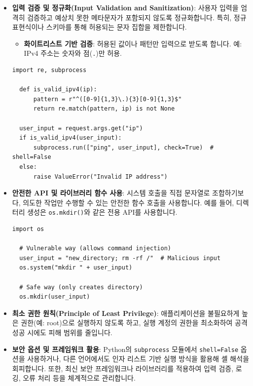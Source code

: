 \documentclass{article}
\begin{document}
\begin{itemize}
  \item \textbf{입력 검증 및 정규화(Input Validation and Sanitization)}:  
  사용자 입력을 엄격히 검증하고 예상치 못한 메타문자가 포함되지 않도록 정규화합니다.  
  특히, 정규 표현식이나 스키마를 통해 허용되는 문자 집합을 제한합니다.  
  \begin{itemize}
    \item \textbf{화이트리스트 기반 검증}: 허용된 값이나 패턴만 입력으로 받도록 합니다.  
    예: IPv4 주소는 숫자와 점(\texttt{.})만 허용.
  \end{itemize}

  \begin{lstlisting}[caption={Python 예시: IPv4 입력값 검증 및 안전 실행}]
  import re, subprocess

  def is_valid_ipv4(ip):
      pattern = r"^([0-9]{1,3}\.){3}[0-9]{1,3}$"
      return re.match(pattern, ip) is not None

  user_input = request.args.get("ip")
  if is_valid_ipv4(user_input):
      subprocess.run(["ping", user_input], check=True)  # shell=False
  else:
      raise ValueError("Invalid IP address")
  \end{lstlisting}

  \item \textbf{안전한 API 및 라이브러리 함수 사용}:  
  시스템 호출을 직접 문자열로 조합하기보다, 의도한 작업만 수행할 수 있는 안전한 함수 호출을 사용합니다.  
  예를 들어, 디렉터리 생성은 \texttt{os.mkdir()}와 같은 전용 API를 사용합니다.

  \begin{lstlisting}[caption={안전하지 않은 방식 vs. 안전한 방식}]
  import os

  # Vulnerable way (allows command injection)
  user_input = "new_directory; rm -rf /"  # Malicious input
  os.system("mkdir " + user_input)  

  # Safe way (only creates directory)
  os.mkdir(user_input)
  \end{lstlisting}

  \item \textbf{최소 권한 원칙(Principle of Least Privilege)}:  
  애플리케이션을 불필요하게 높은 권한(예: root)으로 실행하지 않도록 하고,  
  실행 계정의 권한을 최소화하여 공격 성공 시에도 피해 범위를 줄입니다.

  \item \textbf{보안 옵션 및 프레임워크 활용}:  
  Python의 \texttt{subprocess} 모듈에서 \texttt{shell=False} 옵션을 사용하거나,  
  다른 언어에서도 인자 리스트 기반 실행 방식을 활용해 셸 해석을 회피합니다.  
  또한, 최신 보안 프레임워크나 라이브러리를 적용하여 입력 검증, 로깅, 오류 처리 등을 체계적으로 관리합니다.
  

\end{itemize}
\end{document}
